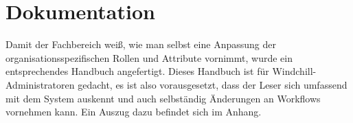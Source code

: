 \section{Dokumentation}
\label{sec:Dokumentation}

Damit der Fachbereich weiß, wie man selbst eine Anpassung der organisationsspezifischen Rollen und Attribute vornimmt, wurde ein entsprechendes Handbuch angefertigt.
Dieses Handbuch ist für Windchill-Administratoren gedacht, es ist also vorausgesetzt, dass der Leser sich umfassend mit dem System auskennt und auch selbständig Änderungen an \zB Workflows vornehmen kann.
Ein Auszug dazu befindet sich im Anhang.
